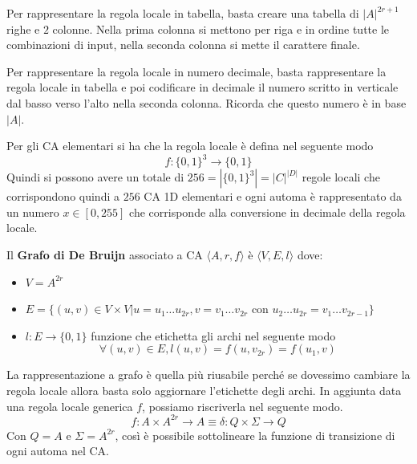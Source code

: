 \begin{esempio} 
    Per rappresentare la regola locale in tabella, basta creare una tabella di
    $|A|^{2r+1}$ righe e $2$ colonne. Nella prima colonna si mettono per riga e in ordine
    tutte le combinazioni di input, nella seconda colonna si mette il carattere
    finale.
\end{esempio}

\begin{esempio} 
    Per rappresentare la regola locale in numero decimale, basta rappresentare
    la regola locale in tabella e poi codificare in decimale il numero scritto in
    verticale dal basso verso l'alto nella seconda colonna. Ricorda che questo numero
    è in base $|A|$.
\end{esempio}

\begin{nota}
    Per gli CA elementari si ha che la regola locale è defina nel seguente modo
    $$f:\{0,1\}^3\rightarrow \{0,1\}$$
    Quindi si possono avere un totale di $256 = |\{0,1\}^3|
        = |C|^{|D|}$ regole locali che
    corrispondono quindi a $256$ CA 1D elementari e ogni automa è rappresentato da un
    numero $x\in [0, 255]$ che corrisponde alla conversione in decimale della regola
    locale.
\end{nota}

\begin{definizione} 
    Il \textbf{Grafo di De Bruijn} associato a CA $\langle A, r, f\rangle$ è $\langle V,E,l\rangle$
    dove:
    \begin{itemize}
        \item $V=A^{2r}$
        \item $E = \{(u,v)\in V\times V | u=u_1\dots u_{2r},  v=v_1\dots v_{2r} \text{ con } u_2\dots u_{2r} = v_1\dots v_{2r-1}\}$
        \item $l:E\rightarrow \{0,1\}$ funzione che etichetta gli archi nel seguente
              modo $$\forall (u,v)\in E, l(u,v) = f(u,v_{2r})=f(u_1,v)$$
    \end{itemize}
\end{definizione}

La rappresentazione a grafo è quella più riusabile perché se dovessimo cambiare
la regola locale allora basta solo aggiornare l'etichette degli archi. In aggiunta
data una regola locale generica $f$, possiamo riscriverla nel seguente modo.
\begin{equation}
    f: A\times A^{2r} \rightarrow A \equiv \delta: Q\times \Sigma \rightarrow Q
\end{equation}
Con $Q= A$ e $\Sigma = A^{2r} $, così è possibile sottolineare la funzione di transizione
di ogni automa nel CA.
